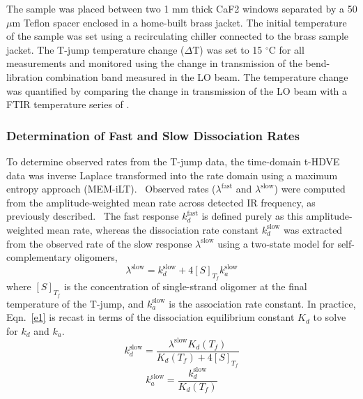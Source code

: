 \documentclass[journal=jpcbfk,manuscript=article]{achemso}
\begin{document}
The sample was placed between two 1 mm thick CaF2 windows separated by a 50 $\mu$m Teflon spacer enclosed in a home-built brass jacket. The initial temperature of the sample was set using a recirculating chiller connected to the brass sample jacket. The T-jump temperature change ($\Delta$T) was set to 15 $^\circ$C for all measurements and monitored using the change in transmission of the  bend-libration combination band measured in the LO beam. The temperature change was quantified by comparing the change in transmission of the LO beam with a FTIR temperature series of . 

\subsubsection{Determination of Fast and Slow Dissociation Rates}\label{sec:TjumpAnalysis}

To determine observed rates from the T-jump data, the time-domain t-HDVE data was inverse Laplace transformed into the rate domain using a maximum entropy approach (MEM-iLT).~\citep{Kumar2001OnTimescales} Observed rates ($\lambda^\mathrm{fast}$ and $\lambda^\mathrm{slow}$) were computed from the amplitude-weighted mean rate across detected IR frequency, as previously described.~\citep{Sanstead2018DirectDehybridization} The fast response $k_d^\mathrm{fast}$ is defined purely as this amplitude-weighted mean rate, whereas the dissociation rate constant $k_d^\mathrm{slow}$ was extracted from the observed rate of the slow response $\lambda^\mathrm{slow}$ using a two-state model for self-complementary oligomers,~\citep{Bernasconi2012RelaxationKinetics}
	\begin{equation}\label{e1}
	\lambda^\mathrm{slow} = k_d^\mathrm{slow} + 4[S]_{T_f}k_a^\mathrm{slow}
	\end{equation}
where $[S]_{T_f}$ is the concentration of single-strand oligomer at the final temperature of the T-jump, and $k_a^\mathrm{slow}$ is the association rate constant. In practice, Eqn.~\ref{e1} is recast in terms of the dissociation equilibrium constant $K_d$ to solve for $k_d$ and $k_a$.
	\begin{equation}\label{e2a}
	k_d^\mathrm{slow} = \frac{\lambda^\mathrm{slow}K_d(T_f)}{K_d(T_f)+4[S]_{T_f}}
	\end{equation}
	\begin{equation}\label{e2b}
	k_a^\mathrm{slow} = \frac{k_d^\mathrm{slow}}{K_d(T_f)}
	\end{equation}
\end{document}
